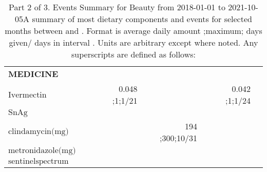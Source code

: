 \begin{table}[H]
\begin{tabular}{|l|r|r|r|r|r|}
{\bf MEDICINE}&&&&&\\
$\textrm{Ivermectin}$&&0.048 ;1;1/21&&0.042 ;1;1/24&\\
$\textrm{SnAg}$&&&&&\\
$\textrm{clindamycin(mg)}$&&&194 ;300;10/31&&\\
$\textrm{metronidazole(mg)}$&&&&&\\
$\textrm{sentinelspectrum}$&&&&&\\
\hline
\end{tabular}
\caption{Part 2 of 3.  Events Summary for Beauty   from 2018-01-01 to 2021-10-05A summary of most dietary components and events  for selected months between \mjmdatemin and \mjmdatemax. Format is average daily amount ;maximum; days given/ days in interval . Units are arbitrary except where noted. Any  superscripts are defined as follows:  \mjmsuperscripts}
\end{table}
